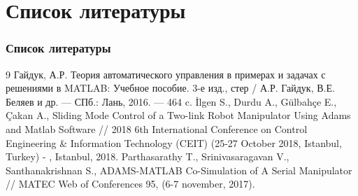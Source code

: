 \documentclass[12pt, aspectratio=169]{beamer}
\begin{document}
    \section{Список литературы}
    \begin{frame}[allowframebreaks]
      \frametitle{Список литературы}
      \vspace{-1.0cm}
      
        \begin {thebibliography}{9}
         \footnotesize Гайдук, А.Р. Теория автоматического управления в примерах и задачах с решениями в MATLAB: 
        Учебное пособие. 3-е изд., стер / А.Р. Гайдук, В.Е. Беляев и др. — СПб.: Лань, 2016. — 464 c.
         \footnotesize İlgen S., Durdu A., Gülbahçe E., Çakan A., Sliding Mode Control of a Two-link Robot
        Manipulator Using Adams and Matlab Software // 2018 6th International Conference on Control Engineering \& Information Technology (CEIT) 
        (25-27 October 2018, Istanbul, Turkey) - , Istanbul, 2018.
         \footnotesize Parthasarathy T., Srinivasaragavan V., Santhanakrishnan S., ADAMS-MATLAB Co-Simulation of A Serial Manipulator 
        // MATEC Web of Conferences 95, (6-7 november, 2017).
      \end{thebibliography} 
    \end{frame}
\end{document}
